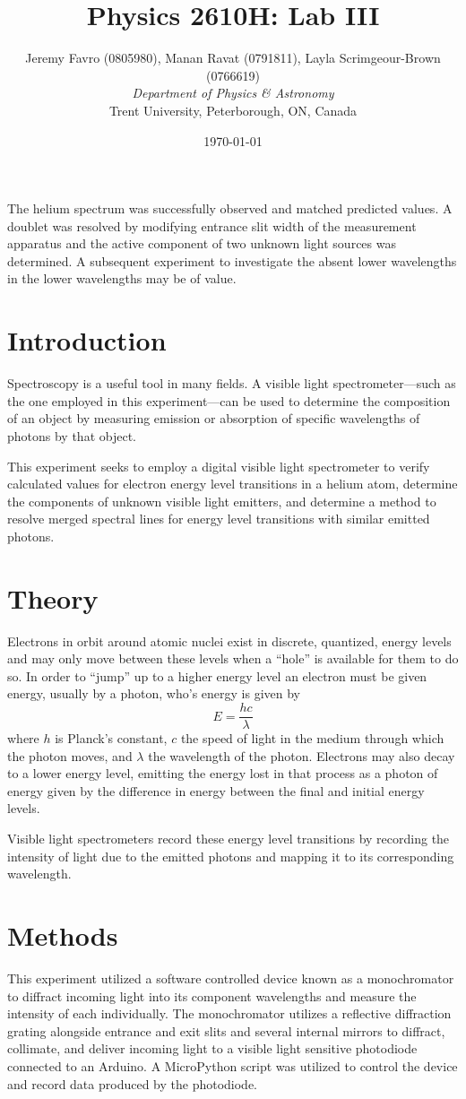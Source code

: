 \documentclass[10pt, twocolumn]{article}
\title{Physics 2610H: Lab III}
\author{Jeremy Favro (0805980),
Manan Ravat (0791811),
Layla Scrimgeour-Brown (0766619)
 \\\emph{Department of Physics \& Astronomy}\\ Trent University, Peterborough, ON, Canada}
\date{\today}
\theoremstyle{definition}
\begin{document}
\maketitle
\begin{abstract}
\end{abstract}
The helium spectrum was successfully observed and matched predicted values. A doublet was resolved by modifying entrance slit width of the
measurement apparatus and the active component of two unknown light sources was determined. A subsequent experiment to investigate the
absent lower wavelengths in the lower wavelengths may be of value.
\section{Introduction}
Spectroscopy is a useful tool in many fields. A visible light spectrometer---such as the one employed in this experiment---can be used to determine the composition of an object by measuring emission or absorption of
specific wavelengths of photons by that object.

This experiment seeks to employ a digital visible light spectrometer to verify calculated values for electron energy level transitions in a helium atom,
determine the components of unknown visible light emitters, and determine a method to resolve merged spectral lines for energy
level transitions with similar emitted photons.
\section{Theory}
Electrons in orbit around atomic nuclei exist in discrete, quantized, energy levels and may only move between these levels when a ``hole''
is available for them to do so. In order to ``jump'' up to a higher energy level an electron must be given energy, usually by a photon, who's energy is given by
$$E=\frac{hc}{\lambda}$$ where $h$ is Planck's constant\autocite{codata}, $c$ the speed of light in the medium through which the photon moves, and $\lambda$ the
wavelength of the photon. Electrons may also decay to a lower energy level, emitting the energy lost in that process as a photon of energy given by the difference in energy
between the final and initial energy levels.

Visible light spectrometers record these energy level transitions by recording the intensity of light due to the emitted photons
and mapping it to its corresponding wavelength.
\vfill\null
\section{Methods}
This experiment utilized a software controlled device known as a monochromator to diffract incoming light into its component wavelengths
and measure the intensity of each individually. The monochromator utilizes a reflective diffraction grating alongside entrance and exit slits
and several internal mirrors to diffract, collimate, and deliver incoming light to a visible light sensitive photodiode connected to an Arduino.
A MicroPython script was utilized to control the device and record data produced by the photodiode.
\end{document}
